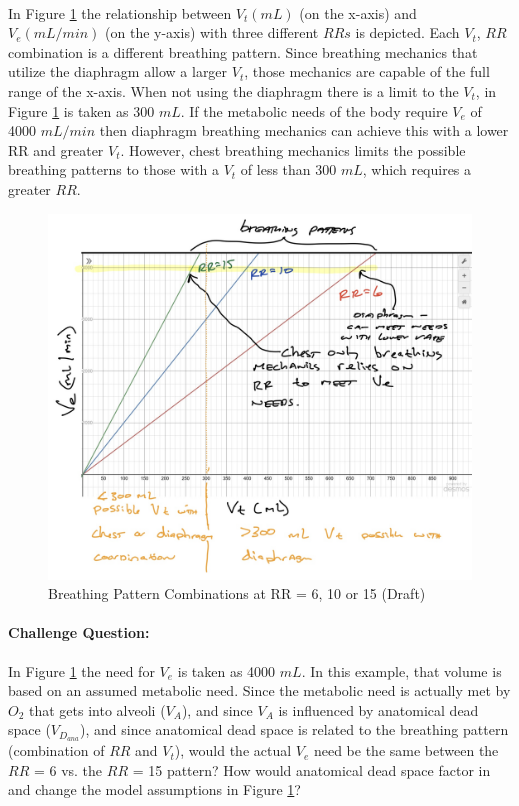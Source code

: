 \paragraph{} In Figure \ref{fig:breathing_patterns} the relationship between $V_t (mL)$ (on the x-axis) and $V_e (mL/min)$ (on the y-axis) with three different $RRs$ is depicted. Each $V_t$, $RR$ combination is a different breathing pattern. Since breathing mechanics that utilize the diaphragm allow a larger $V_t$, those mechanics are capable of the full range of the x-axis. When not using the diaphragm there is a limit to the $V_t$, in Figure \ref{fig:breathing_patterns} is taken as 300 $mL$. If the metabolic needs of the body require $V_e$ of 4000 $mL/min$ then diaphragm breathing mechanics can achieve this with a lower RR and greater $V_t$. However, chest breathing mechanics limits the possible breathing patterns to those with a $V_t$ of less than 300 $mL$, which requires a greater $RR$.

\begin{figure}
    \centering
    \includegraphics[width=1.0 \linewidth]{./figure/ventilation/breathing_patterns.jpg}
    \caption{Breathing Pattern Combinations at RR = 6, 10 or 15 (Draft)}
    \label{fig:breathing_patterns}
\end{figure}

\paragraph{Challenge Question:} In Figure \ref{fig:breathing_patterns} the need for $V_e$ is taken as 4000 $mL$. In this example, that volume is based on an assumed metabolic need. Since the metabolic need is actually met by $O_2$ that gets into alveoli ($V_A$), and since $V_A$ is influenced by anatomical dead space ($V_D_{ana}$), and since anatomical dead space is related to the breathing pattern (combination of $RR$ and $V_t$), would the actual $V_e$ need be the same between the $RR$ = 6 vs. the $RR$ = 15 pattern? How would anatomical dead space factor in and change the model assumptions in Figure \ref{fig:breathing_patterns}?


